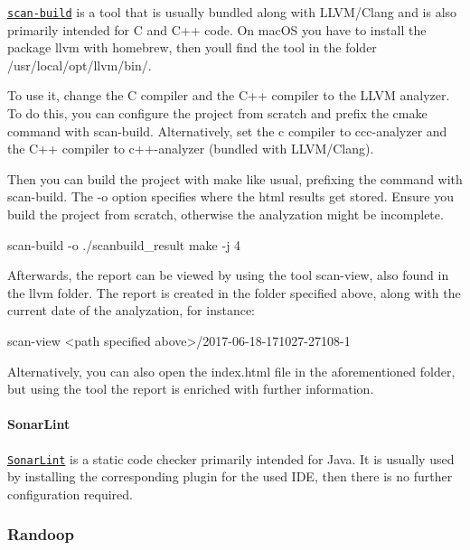 \href{http://clang-analyzer.llvm.org/scan-build.html}{\tt scan-\/build} is a tool that is usually bundled along with L\+L\+V\+M/\+Clang and is also primarily intended for C and C++ code. On mac\+OS you have to install the package {\ttfamily llvm} with homebrew, then you\textquotesingle{}ll find the tool in the folder {\ttfamily /usr/local/opt/llvm/bin/}.

To use it, change the C compiler and the C++ compiler to the L\+L\+VM analyzer. To do this, you can configure the project from scratch and prefix the cmake command with {\ttfamily scan-\/build}. Alternatively, set the c compiler to {\ttfamily ccc-\/analyzer} and the C++ compiler to {\ttfamily c++-\/analyzer} (bundled with L\+L\+V\+M/\+Clang).

Then you can build the project with {\ttfamily make} like usual, prefixing the command with {\ttfamily scan-\/build}. The {\ttfamily -\/o} option specifies where the html results get stored. Ensure you build the project from scratch, otherwise the analyzation might be incomplete. \begin{DoxyVerb}scan-build -o ./scanbuild_result make -j 4
\end{DoxyVerb}


Afterwards, the report can be viewed by using the tool {\ttfamily scan-\/view}, also found in the llvm folder. The report is created in the folder specified above, along with the current date of the analyzation, for instance\+: \begin{DoxyVerb}scan-view <path specified above>/2017-06-18-171027-27108-1
\end{DoxyVerb}


Alternatively, you can also open the {\ttfamily index.\+html} file in the aforementioned folder, but using the tool the report is enriched with further information.

\paragraph*{Sonar\+Lint}

\href{http://www.sonarlint.org/}{\tt Sonar\+Lint} is a static code checker primarily intended for Java. It is usually used by installing the corresponding plugin for the used I\+DE, then there is no further configuration required.

\subsubsection*{Randoop}

